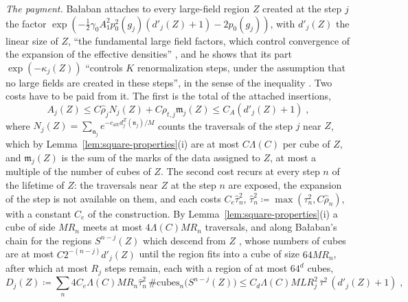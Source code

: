 \documentclass[11pt]{preprint}
\numberwithin{equation}{section}
\theoremstyle{definition}
\theoremstyle{remark}
\theoremstyle{plain}
\begin{document}
\emph{The payment.} Ba{\l}aban attaches to every large-field region $Z$ created at the step $j$ the factor $\exp(-\frac12\gamma_0A_1^2p_0^2(g_j)(d'_j(Z) + 1) - 2p_0(g_j))$, with $d'_j(Z)$ the linear size of $Z$, ``the fundamental large field factors, which control convergence of the expansion of the effective densities'' \cite[p.~381]{BalabanLFR2}, and he shows that its part $\exp(-\kappa_j(Z))$ ``controls $K$ renormalization steps, under the assumption that no large fields are created in these steps'', in the sense of the inequality \cite[(1.80), p.~384]{BalabanLFR2}. Two costs have to be paid from it. The first is the total of the attached insertions,
\begin{equation}\label{eq:attached-total}
    A_j(Z) \leq C\hat\rho_jN_j(Z) + C\rho_{t,j}\mathfrak m_j(Z) \leq C_A(d'_j(Z) + 1)\;,
\end{equation}
where $N_j(Z) = \sum_{\mathfrak n_j}e^{-c_{\mathrm{att}}d^Z_j(\mathfrak n_j)/M}$ counts the traversals of the step $j$ near $Z$, which by Lemma~\ref{lem:square-properties}(i) are at most $C\Lambda(C)$ per cube of $Z$, and $\mathfrak m_j(Z)$ is the sum of the marks of the data assigned to $Z$, at most a multiple of the number of cubes of $Z$. The second cost recurs at every step $n$ of the lifetime of $Z$: the traversals near $Z$ at the step $n$ are exposed, the expansion of the step is not available on them, and each costs $C_e\hat\tau_n^2$, $\hat\tau_n^2 \coloneqq \max(\tau_n^2, C\hat\rho_n)$, with a constant $C_e$ of the construction. By Lemma~\ref{lem:square-properties}(i) a cube of side $MR_n$ meets at most $4\Lambda(C)MR_n$ traversals, and along Ba{\l}aban's chain for the regions $S^{n-j}(Z)$ which descend from $Z$ \cite[pp.~384--385]{BalabanLFR2}, whose numbers of cubes are at most $C2^{-(n-j)}d'_j(Z)$ until the region fits into a cube of size $64MR_n$, after which at most $R_j$ steps remain, each with a region of at most $64^d$ cubes,
\begin{equation}\label{eq:lifetime-cost}
    D_j(Z) \coloneqq \sum_n4C_e\Lambda(C)MR_n\hat\tau_n^2\,\#\mathrm{cubes}_n\bigl(S^{n-j}(Z)\bigr) \leq C_d\Lambda(C)MLR_j^2\,\bar\tau^2\,(d'_j(Z) + 1)\;,
\end{equation}
\end{document}
